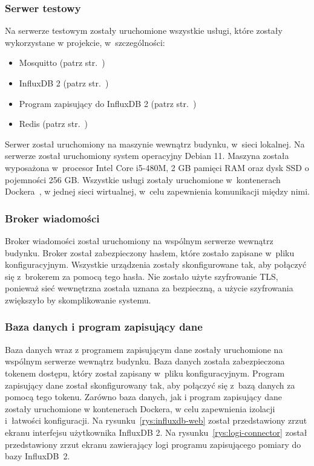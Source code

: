 \subsubsection{Serwer testowy}
Na serwerze testowym zostały uruchomione wszystkie usługi, które zostały wykorzystane w projekcie, w~szczególności:
\begin{itemize}
    \item Mosquitto (patrz str.~\pageref{impl:mosquitto})
    \item InfluxDB 2 (patrz str.~\pageref{impl:db})
    \item Program zapisujący do InfluxDB 2 (patrz str.~\pageref{impl:save})
    \item Redis (patrz str.~\pageref{impl:redis})
\end{itemize}
Serwer został uruchomiony na maszynie wewnątrz budynku, w~sieci lokalnej.
Na serwerze został uruchomiony system operacyjny Debian 11.
Maszyna została wyposażona w~procesor Intel Core i5-480M, 2 GB pamięci RAM oraz dysk SSD o pojemności 256 GB.
Wszystkie usługi zostały uruchomione w~kontenerach Dockera~\cite{tool:docker}, w jednej sieci wirtualnej, w~celu zapewnienia komunikacji między nimi.

\subsubsection{Broker wiadomości}
Broker wiadomości został uruchomiony na wspólnym serwerze wewnątrz budynku.
Broker został zabezpieczony hasłem, które zostało zapisane w~pliku konfiguracyjnym.
Wszystkie urządzenia zostały skonfigurowane tak, aby połączyć się z~brokerem za pomocą tego hasła.
Nie zostało użyte szyfrowanie TLS, ponieważ sieć wewnętrzna została uznana za bezpieczną, a użycie szyfrowania zwiększyło by skomplikowanie systemu.

\subsubsection{Baza danych i program zapisujący dane}
Baza danych wraz z programem zapisującym dane zostały uruchomione na wspólnym serwerze wewnątrz budynku.
Baza danych została zabezpieczona tokenem dostępu, który został zapisany w~pliku konfiguracyjnym.
Program zapisujący dane został skonfigurowany tak, aby połączyć się z~bazą danych za pomocą tego tokenu.
Zarówno baza danych, jak i program zapisujący dane zostały uruchomione w kontenerach Dockera, w celu zapewnienia izolacji i~łatwości konfiguracji.
Na rysunku~\ref{rys:influxdb-web} został przedstawiony zrzut ekranu interfejsu użytkownika InfluxDB 2.
Na rysunku~\ref{rys:logi-connector} został przedstawiony zrzut ekranu zawierający logi programu zapisującego pomiary do bazy InfluxDB~2.

